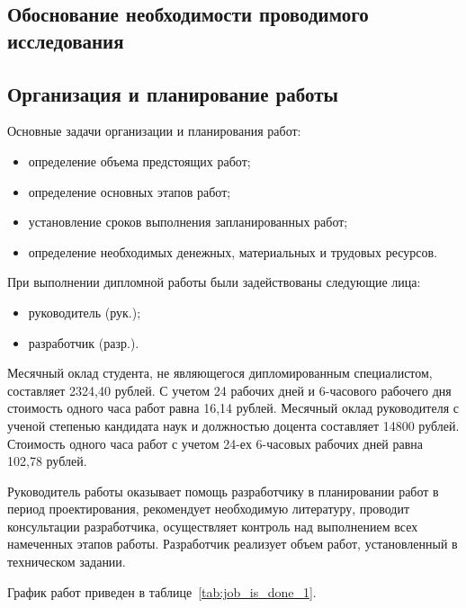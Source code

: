 \subsection{Обоснование необходимости проводимого исследования}

\subsection{Организация и планирование работы}

Основные задачи организации и планирования работ:
\begin{itemize}
 \item определение объема предстоящих работ;
 \item определение основных этапов работ;
 \item установление сроков выполнения запланированных работ;
 \item определение необходимых денежных, материальных и трудовых ресурсов.
\end{itemize}


При выполнении дипломной работы были задействованы следующие лица:
\begin{itemize}
 \item руководитель (рук.);
 \item разработчик (разр.).
\end{itemize}

Месячный оклад студента, не являющегося дипломированным специалистом, составляет 2324,40 рублей.
С учетом 24 рабочих дней и 6-часового рабочего дня стоимость одного часа работ равна 16,14 рублей.
Месячный оклад руководителя с ученой степенью кандидата наук и должностью доцента составляет 14800 рублей.
Стоимость одного часа работ с учетом 24-ех 6-часовых рабочих дней равна 102,78 рублей.   

Руководитель работы оказывает помощь разработчику в планировании работ в период проектирования, рекомендует
необходимую литературу, проводит консультации разработчика, осуществляет контроль над выполнением всех 
намеченных этапов работы. Разработчик реализует объем работ, установленный в техническом задании.

График работ приведен в таблице~\ref{tab:job_is_done_1}.

